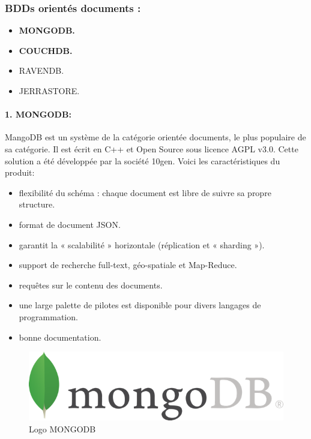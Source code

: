 \subsubsection{BDDs orientés documents :}

\begin{itemize}[label=\textbullet]
\item \textbf{MONGODB.}
\item  \textbf{COUCHDB.}
\item  RAVENDB.
\item  JERRASTORE.
\end{itemize}

\paragraph{1. MONGODB:}
MangoDB est un système de la catégorie orientée documents, le plus populaire de sa catégorie. Il est écrit en C++ et Open Source sous licence AGPL v3.0. Cette solution a été développée par la société 10gen. Voici les caractéristiques du produit:

\begin{itemize}[label=]
\item flexibilité du schéma : chaque document est libre de suivre sa propre structure.
\item format de document JSON.
\item garantit la « scalabilité » horizontale (réplication et « sharding »).
\item support de recherche full-text, géo-spatiale et Map-Reduce.
\item requêtes sur le contenu des documents.
\item une large palette de pilotes est disponible pour divers langages de programmation.
\item bonne documentation.
\end{itemize}

\begin{figure}[h]
	\centering
    \includegraphics[scale=0.3]{img/part1/4.11}
    \caption{Logo MONGODB}
\end{figure}


